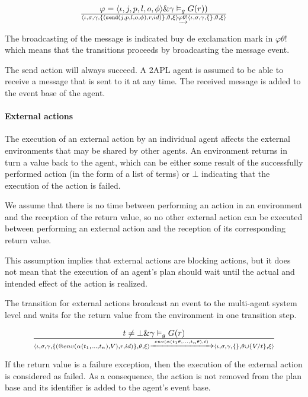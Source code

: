 \documentclass[a4paper]{article}
\begin{document}
$$ {\varphi = \langle \iota, j, p, l, o, \phi \rangle} \& \gamma \vDash_{g} G(r))\over{ \langle \iota, \sigma, \gamma, \{(\texttt{send}(j, p, l, o, \phi),r, id)\}, \theta, \xi \rangle \underrightarrow{\varphi\theta!} \langle \iota, \sigma, \gamma, \{\}, \theta, \xi \rangle} $$

The broadcasting of the message is indicated buy de exclamation mark in $\varphi\theta!$ which means that the transitions proceeds by broadcasting the message event.

The send action will always succeed. A 2APL agent is assumed to be able to receive a message that is sent to it at any time. The received message is added to the event base of the agent.

\paragraph{External actions}

The execution of an external action by an individual agent affects the external environments that may be shared by other agents. An environment returns in turn a value back to the agent, which can be either some result of the successfully performed action (in the form of a list of terms) or $\bot$ indicating that the execution of the action is failed.

We assume that there is no time between performing an action in an environment and the reception of the return value, so no other external action can be executed between performing an external action and the reception of its corresponding return value.

This assumption implies that external actions are blocking actions, but it does not mean that the execution of an agent's plan should wait until the actual and intended effect of the action is realized.

The transition for external actions broadcast an event to the multi-agent system level and waits for the return value from the environment in one transition step.

$$ {t \neq \bot \& \gamma \vDash_{g} G(r)} \over {\langle \iota, \sigma, \gamma, \{(@env(\alpha(t_{1}, \ldots, t_{n}), V), r, id)\},\theta, \xi \rangle \xrightarrow{env(\alpha(t_{1}\theta, \ldots, t_{n}\theta), t)} \langle \iota, \sigma, \gamma, \{\}, \theta \cup \{ V/t\}, \xi \rangle } $$

If the return value is a failure exception, then the execution of the external action is considered as failed. As a consequence, the action is not removed from the plan base and its identifier is added to the agent's event base.
\end{document}
